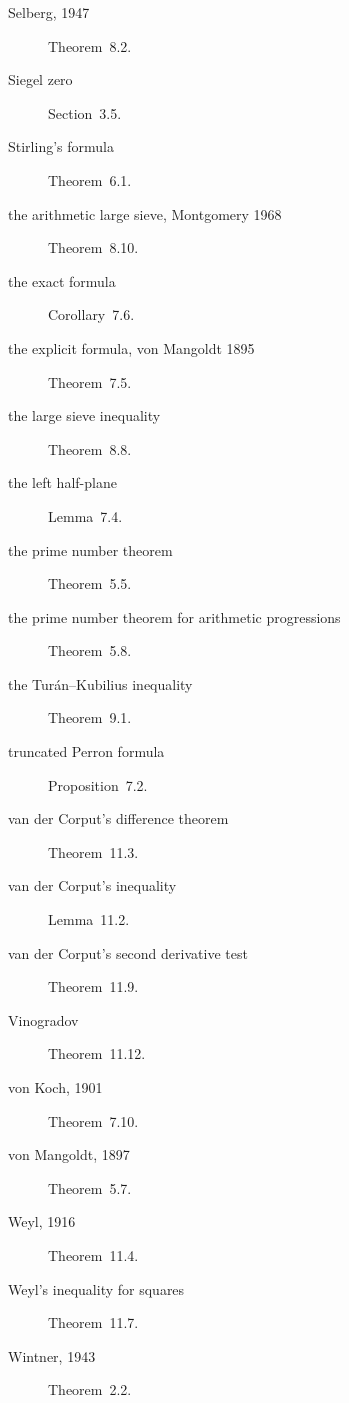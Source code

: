 \begin{description}
\item[Selberg, 1947] Theorem~8.2.
\item[Siegel zero] Section~3.5.
\item[Stirling's formula] Theorem~6.1.
\item[the arithmetic large sieve, Montgomery 1968] Theorem~8.10.
\item[the exact formula] Corollary~7.6.
\item[the explicit formula, von Mangoldt 1895] Theorem~7.5.
\item[the large sieve inequality] Theorem~8.8.
\item[the left half-plane] Lemma~7.4.
\item[the prime number theorem] Theorem~5.5.
\item[the prime number theorem for arithmetic progressions] Theorem~5.8.
\item[the Turán--Kubilius inequality] Theorem~9.1.
\item[truncated Perron formula] Proposition~7.2.
\item[van der Corput's difference theorem] Theorem~11.3.
\item[van der Corput's inequality] Lemma~11.2.
\item[van der Corput's second derivative test] Theorem~11.9.
\item[Vinogradov] Theorem~11.12.
\item[von Koch, 1901] Theorem~7.10.
\item[von Mangoldt, 1897] Theorem~5.7.
\item[Weyl, 1916] Theorem~11.4.
\item[Weyl's inequality for squares] Theorem~11.7.
\item[Wintner, 1943] Theorem~2.2.
\end{description}
